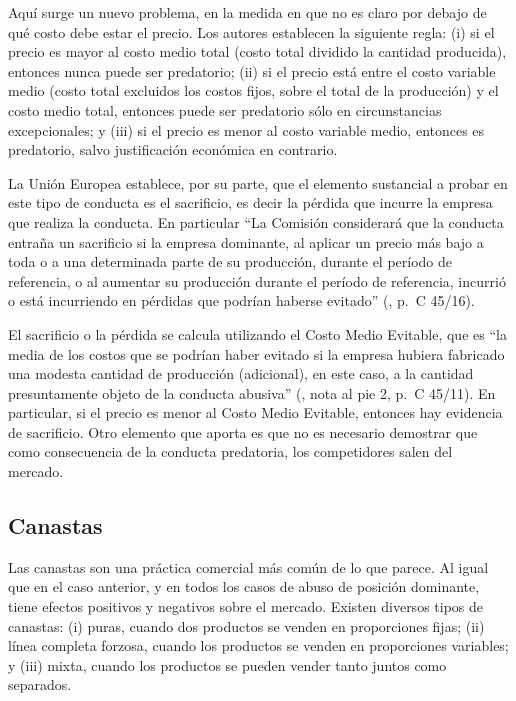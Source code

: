 \documentclass[
  12pt,
  spanish,
]{book}
\begin{document}
Aquí surge un nuevo problema, en la medida en que no es claro por debajo
de qué costo debe estar el precio. Los autores establecen la siguiente
regla: (i) si el precio es mayor al costo medio total (costo total
dividido la cantidad producida), entonces nunca puede ser predatorio;
(ii) si el precio está entre el costo variable medio (costo total
excluidos los costos fijos, sobre el total de la producción) y el costo
medio total, entonces puede ser predatorio sólo en circunstancias
excepcionales; y (iii) si el precio es menor al costo variable medio,
entonces es predatorio, salvo justificación económica en contrario.

La Unión Europea establece, por su parte, que el elemento sustancial a
probar en este tipo de conducta es el sacrificio, es decir la pérdida
que incurre la empresa que realiza la conducta. En particular ``La
Comisión considerará que la conducta entraña un sacrificio si la empresa
dominante, al aplicar un precio más bajo a toda o a una determinada
parte de su producción, durante el período de referencia, o al aumentar
su producción durante el período de referencia, incurrió o está
incurriendo en pérdidas que podrían haberse evitado'' (\citet{UE2009},
p.~C 45/16).

El sacrificio o la pérdida se calcula utilizando el Costo Medio
Evitable, que es ``la media de los costos que se podrían haber evitado
si la empresa hubiera fabricado una modesta cantidad de producción
(adicional), en este caso, a la cantidad presuntamente objeto de la
conducta abusiva'' (\citet{UE2009}, nota al pie 2, p.~C 45/11). En
particular, si el precio es menor al Costo Medio Evitable, entonces hay
evidencia de sacrificio. Otro elemento que aporta es que no es necesario
demostrar que como consecuencia de la conducta predatoria, los
competidores salen del mercado.

\hypertarget{canastas}{%
\subsection{Canastas}\label{canastas}}

Las canastas son una práctica comercial más común de lo que parece. Al
igual que en el caso anterior, y en todos los casos de abuso de posición
dominante, tiene efectos positivos y negativos sobre el mercado. Existen
diversos tipos de canastas: (i) puras, cuando dos productos se venden en
proporciones fijas; (ii) línea completa forzosa, cuando los productos se
venden en proporciones variables; y (iii) mixta, cuando los productos se
pueden vender tanto juntos como separados.
\end{document}
